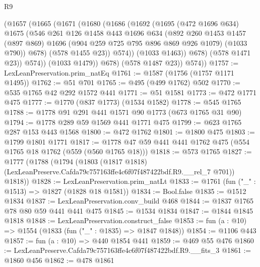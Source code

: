 \begin{lexlean}{R9}
\begin{coremodule}
                (@1657
                  (@1665
                    (@1671
                      (@1680
                        (@1686
                          (@1692
                            (@1695
                              (@472 @1696 @634)
                              @1675
                              (@546
                                @261
                                @126
                                @1458
                                @443
                                @1696
                                @634
                                (@892
                                  @260
                                  @1453
                                  @1457
                                  (@897 @869)
                                  @1696
                                  (@904 @259 @725 @795 @896 @869 @926 @1079)
                                  (@1033 @790))
                                @678)
                              (@578 @1455 @23))
                            @574))
                        (@1033 @1463))
                      @678)
                    (@578 @1471 @23))
                  @574))
              (@1033 @1479))
            @678)
          (@578 @1487 @23))
        @574))
@1757 := LexLeanPreservation.prim_natEq
@1761 := @1587 (@1756 (@1757 @1171 @1495))
@1762 := @51 @701
@1765 := @495 (@499 @1762) @502
@1770 := @535 @1765 @42 @292 @1572 @441
@1771 := @51 @1581
@1773 := @472 @1771 @475
@1777 := @1770 (@837 @1773) (@1534 @1582)
@1778 := @545 @1765
@1788 := @1778 @91 @291 @441 @1571 @90 @1773 (@673 @1765 @31 @90)
@1794 := @1778 @289 @59 @1569 @441 @1771 @475
@1799 := @623 @1765 @287 @153 @443 @1568
@1800 := @472 @1762
@1801 := @1800 @475
@1803 := @1799 @1801 @1771
@1817 := @1778 @47 @59 @441 @441 @1762 @475 (@554 @1765 @18 @1762 (@559 (@560 @1765 @18)))
@1818 := @573 @1765
@1827 := @1777
    (@1788
      (@1794
        (@1803 (@1817 @1818) (LexLeanPreserve.Cafda79c757163ffe4c6f07f487422bdf.R9.__rel_7 @701))
        @1818))
@1828 := LexLeanPreservation.prim_natLt
@1833 := @1761 (fun ("_" : @1513) => @1827 (@1828 @18 @1581))
@1834 := Bool.false
@1835 := @1512 @1834
@1837 := LexLeanPreservation.conv_build @468
@1844 := @1837 @1765 @78 @80 @59 @441 @441 @475
@1845 := @1534 @1834
@1847 := @1844 @1845 @1818
@1848 := LexLeanPreservation.construct_false
@1853 := fun (a : @10) => @1554 (@1833 (fun ("_" : @1835) => @1847 @1848))
@1854 := @1106 @443
@1857 := fun (a : @10) => @440 @1854 @441
@1859 := @469 @55 @476
@1860 := LexLeanPreserve.Cafda79c757163ffe4c6f07f487422bdf.R9.__fits_3
@1861 := @1860 @456
@1862 := @478 @1861

\end{coremodule}
\end{lexlean}
